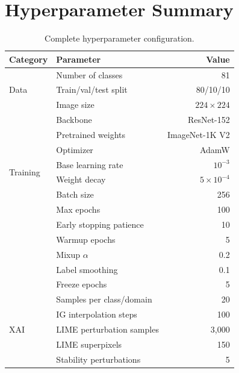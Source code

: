 \documentclass[12pt, a4paper]{article}
\begin{document}
\appendix

\section{Hyperparameter Summary}
\label{app:hyperparams}

\begin{table}[H]
\centering
\caption{Complete hyperparameter configuration.}
\label{tab:hyperparams}
\begin{tabular}{llr}
\toprule
\textbf{Category} & \textbf{Parameter} & \textbf{Value} \\
\midrule
\multirow{3}{*}{Data}
    & Number of classes       & 81 \\
    & Train/val/test split    & 80/10/10 \\
    & Image size              & $224 \times 224$ \\
\midrule
\multirow{8}{*}{Training}
    & Backbone                & ResNet-152 \\
    & Pretrained weights      & ImageNet-1K V2 \\
    & Optimizer               & AdamW \\
    & Base learning rate      & $10^{-3}$ \\
    & Weight decay            & $5 \times 10^{-4}$ \\
    & Batch size              & 256 \\
    & Max epochs              & 100 \\
    & Early stopping patience & 10 \\
    & Warmup epochs           & 5 \\
    & Mixup $\alpha$          & 0.2 \\
    & Label smoothing         & 0.1 \\
    & Freeze epochs           & 5 \\
\midrule
\multirow{5}{*}{XAI}
    & Samples per class/domain & 20 \\
    & IG interpolation steps   & 100 \\
    & LIME perturbation samples & 3{,}000 \\
    & LIME superpixels          & 150 \\
    & Stability perturbations   & 5 \\
\bottomrule
\end{tabular}
\end{table}
\end{document}
